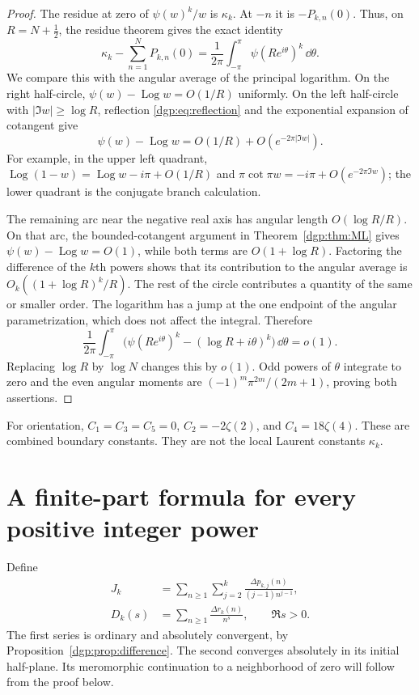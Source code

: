 \begin{proof}
The residue at zero of $\psi(w)^k/w$ is $\kappa_k$.  At $-n$ it is
$-P_{k,n}(0)$.  Thus, on $R=N+\tfrac12$, the residue theorem gives
the exact identity
\begin{equation}
 \kappa_k-\sum_{n=1}^N P_{k,n}(0)
       =\frac1{2\pi}\int_{-\pi}^{\pi}
                           \psi(Re^{i\theta})^k\,\dd\theta.
 \label{dgp:eq:exact-circle}
\end{equation}
We compare this with the angular average of the principal logarithm.
On the right half-circle, $\psi(w)-\operatorname{Log} w=O(1/R)$ uniformly.
On the left half-circle with $|\Im w|\ge\log R$, reflection
\eqref{dgp:eq:reflection} and the exponential expansion of cotangent give
\[
 \psi(w)-\operatorname{Log} w=O(1/R)+O(e^{-2\pi|\Im w|}).
\]
For example, in the upper left quadrant,
$\operatorname{Log}(1-w)=\operatorname{Log} w-i\pi+O(1/R)$ and
$\pi\cot\pi w=-i\pi+O(e^{-2\pi\Im w})$; the lower quadrant is
the conjugate branch calculation.

The remaining arc near the negative real axis has angular length
$O(\log R/R)$.  On that arc, the bounded-cotangent argument in
Theorem~\ref{dgp:thm:ML} gives $\psi(w)-\operatorname{Log} w=O(1)$, while both
terms are $O(1+\log R)$.  Factoring the difference of the $k$th
powers shows that its contribution to the angular average is
$O_k((1+\log R)^k/R)$.  The rest of the circle contributes a quantity
of the same or smaller order.  The logarithm has a jump at the one
endpoint of the angular parametrization, which does not affect the
integral.  Therefore
\[
 \frac1{2\pi}\int_{-\pi}^{\pi}
   \bigl(\psi(Re^{i\theta})^k-(\log R+i\theta)^k\bigr)
                                      \,\dd\theta=o(1).
\]
Replacing $\log R$ by $\log N$ changes this by $o(1)$.  Odd powers
of $\theta$ integrate to zero and the even angular moments are
$(-1)^m\pi^{2m}/(2m+1)$, proving both assertions.
\end{proof}

For orientation, $C_1=C_3=C_5=0$, $C_2=-2\zeta(2)$, and
$C_4=18\zeta(4)$.  These are combined boundary constants.  They are
not the local Laurent constants $\kappa_k$.

\section{A finite-part formula for every positive integer power}
\label{dgp:sec:bridge}

Define
\begin{align}
 J_k&=\sum_{n\ge1}\sum_{j=2}^k
          \frac{\Delta p_{k,j}(n)}{(j-1)n^{j-1}},
 \label{dgp:eq:Jdef}\\
 D_k(s)&=\sum_{n\ge1}\frac{\Delta r_k(n)}{n^s},
                       \qquad \Re s>0.
 \label{dgp:eq:Ddef}
\end{align}
The first series is ordinary and absolutely convergent, by
Proposition~\ref{dgp:prop:difference}.  The second converges absolutely
in its initial half-plane.  Its meromorphic continuation to a
neighborhood of zero will follow from the proof below.

